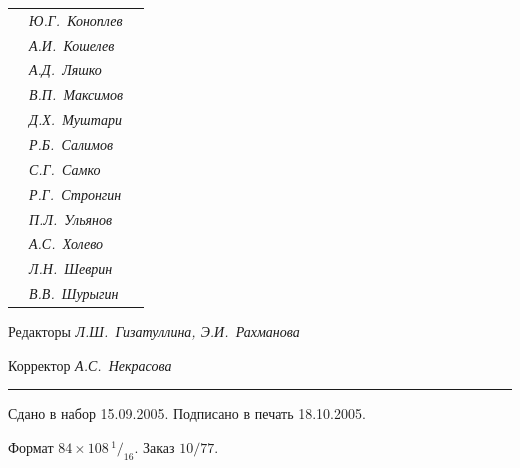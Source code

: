 \begin{tabular}{p{63mm}p{40mm}p{50mm}}
                               &   \it Ю.Г.~Коноплев & \\


                               &   \it А.И.~Кошелев  & \\


                               &   \it А.Д.~Ляшко  & \\


                               &   \it В.П.~Максимов  & \\


                               &   \it Д.Х.~Муштари & \\


                               &   \it Р.Б.~Салимов  & \\


                               &   \it С.Г.~Самко  & \\


                               &   \it Р.Г.~Стронгин  & \\


                               &   \it П.Л.~Ульянов  & \\


                               &   \it А.С.~Холево  & \\


                               &   \it Л.Н.~Шеврин  & \\


                               &   \it В.В.~Шурыгин  & \\


\end{tabular} 


\bigskip 


\bigskip 


\bigskip 





 


\centerline{Редакторы \it Л.Ш.~Гизатуллина, Э.И.~Рахманова}


\centerline{Корректор \it А.С.~Некрасова}


\bigskip 


\hrule 


\setlength{\hoffset}{-23mm}


\bigskip


\noindent Сдано в набор 15.09.2005. Подписано в печать 18.10.2005.


Формат $84\times 108 \,^1/_{16}.$ Заказ $10/77$.\\


